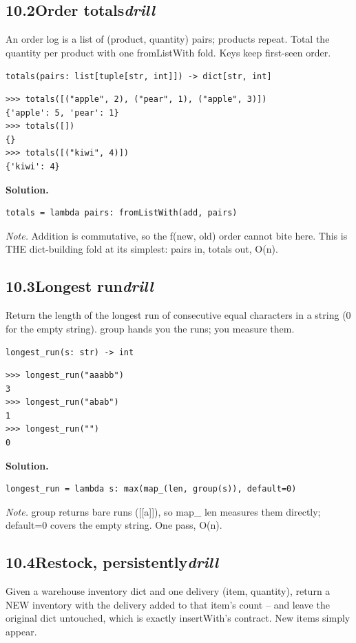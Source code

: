 \documentclass[10pt,letterpaper]{book}
\begin{document}
\subsection*{10.2\quad Order totals\hfill\textnormal{\textit{drill}}}
An order log is a list of (product, quantity) pairs; products repeat. Total the quantity per product with one fromListWith fold. Keys keep first-seen order.

\noindent\texttt{totals(pairs: list[tuple[str, int]]) -> dict[str, int]}
\begin{lstlisting}[style=ex]
>>> totals([("apple", 2), ("pear", 1), ("apple", 3)])
{'apple': 5, 'pear': 1}
>>> totals([])
{}
>>> totals([("kiwi", 4)])
{'kiwi': 4}
\end{lstlisting}
\noindent\textbf{Solution.}
\begin{lstlisting}[style=code]
totals = lambda pairs: fromListWith(add, pairs)
\end{lstlisting}
\noindent\textit{Note.} Addition is commutative, so the f(new, old) order cannot bite here. This is THE dict-building fold at its simplest: pairs in, totals out, O(n).

\subsection*{10.3\quad Longest run\hfill\textnormal{\textit{drill}}}
Return the length of the longest run of consecutive equal characters in a string (0 for the empty string). group hands you the runs; you measure them.

\noindent\texttt{longest\_run(s: str) -> int}
\begin{lstlisting}[style=ex]
>>> longest_run("aaabb")
3
>>> longest_run("abab")
1
>>> longest_run("")
0
\end{lstlisting}
\noindent\textbf{Solution.}
\begin{lstlisting}[style=code]
longest_run = lambda s: max(map_(len, group(s)), default=0)
\end{lstlisting}
\noindent\textit{Note.} group returns bare runs ([[a]]), so map\_ len measures them directly; default=0 covers the empty string. One pass, O(n).

\subsection*{10.4\quad Restock, persistently\hfill\textnormal{\textit{drill}}}
Given a warehouse inventory dict and one delivery (item, quantity), return a NEW inventory with the delivery added to that item's count -- and leave the original dict untouched, which is exactly insertWith's contract. New items simply appear.
\end{document}
